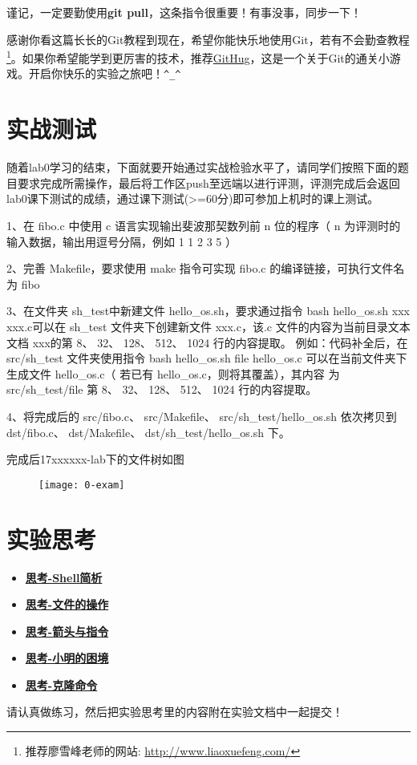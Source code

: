 谨记，一定要勤使用\textbf{git pull}，这条指令很重要！有事没事，同步一下！

感谢你看这篇长长的Git教程到现在，希望你能快乐地使用Git，若有不会勤查教程\footnote{推荐廖雪峰老师的网站:
\url{http://www.liaoxuefeng.com/}}。如果你希望能学到更厉害的技术，推荐\href{https://github.com/Gazler/githug}{GitHug}，这是一个关于Git的通关小游戏。开启你快乐的实验之旅吧！\verb|^_^|

\section{实战测试}
随着lab0学习的结束，下面就要开始通过实战检验水平了，请同学们按照下面的题目要求完成所需操作，最后将工作区push至远端以进行评测，评测完成后会返回lab0课下测试的成绩，通过课下测试(>=60分)即可参加上机时的课上测试。
\begin{exercise}

1、在 fibo.c 中使用 c 语言实现输出斐波那契数列前 n 位的程序（ n 为评测时的输入数据，输出用逗号分隔，例如 1 1 2 3 5 ）

2、完善 Makefile，要求使用 make 指令可实现 fibo.c 的编译链接，可执行文件名为 fibo

3、在文件夹 sh\_test中新建文件 hello\_os.sh，要求通过指令 bash hello\_os.sh xxx xxx.c可以在 sh\_test 文件夹下创建新文件 xxx.c，该.c 文件的内容为当前目录文本文档 xxx的第 8、 32、 128、 512、 1024 行的内容提取。
例如：代码补全后，在 src/sh\_test 文件夹使用指令 bash hello\_os.sh file hello\_os.c
可以在当前文件夹下生成文件 hello\_os.c（ 若已有 hello\_os.c，则将其覆盖），其内容
为 src/sh\_test/file 第 8、 32、 128、 512、 1024 行的内容提取。

4、将完成后的 src/fibo.c、 src/Makefile、 src/sh\_test/hello\_os.sh 依次拷贝到
dst/fibo.c、 dst/Makefile、 dst/sh\_test/hello\_os.sh 下。

完成后17xxxxxx-lab下的文件树如图
\end{exercise}

\begin{figure}[htbp]
  \centering
  \texttt{[image: 0-exam]}
\end{figure}

\section{实验思考}
\begin{itemize}
\item \hyperref[think-Shell简析]{\textbf{\textcolor{baseB}{思考-Shell简析}}}
\item \hyperref[think-文件的操作]{\textbf{\textcolor{baseB}{思考-文件的操作}}}
\item \hyperref[think-箭头与指令]{\textbf{\textcolor{baseB}{思考-箭头与指令}}}
\item \hyperref[think-小明的困境]{\textbf{\textcolor{baseB}{思考-小明的困境}}}
\item \hyperref[think-克隆]{\textbf{\textcolor{baseB}{思考-克隆命令}}}
\end{itemize}

请认真做练习，然后把实验思考里的内容附在实验文档中一起提交！
